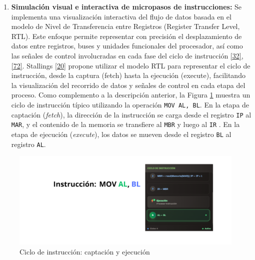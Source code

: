 \documentclass[12pt,oneside]{templates/unerthesis}
\providecommand{\tightlist}{%
  \setlength{\itemsep}{0pt}\setlength{\parskip}{0pt}}
\begin{document}
\begin{enumerate}
\def\labelenumi{\arabic{enumi}.}
\setcounter{enumi}{3}
\tightlist
\item
  \textbf{Simulación visual e interactiva de micropasos de instrucciones:}
  Se implementa una visualización interactiva del flujo de datos basada en el modelo de Nivel de Transferencia entre Registros (Register Transfer Level, RTL). Este enfoque permite representar con precisión el desplazamiento de datos entre registros, buses y unidades funcionales del procesador, así como las señales de control involucradas en cada fase del ciclo de instrucción \protect\hyperlink{ref-harris2015digital}{{[}32{]}}, \protect\hyperlink{ref-ASMVisualizer2025}{{[}72{]}}. Stallings \protect\hyperlink{ref-stallings_computer_2021}{{[}20{]}} propone utilizar el modelo RTL para representar el ciclo de instrucción, desde la captura (fetch) hasta la ejecución (execute), facilitando la visualización del recorrido de datos y señales de control en cada etapa del proceso.
  Como complemento a la descripción anterior, la Figura \ref{fig:cicloinstruccion} muestra un ciclo de instrucción típico utilizando la operación \texttt{MOV\ AL,\ BL}. En la etapa de captación (\emph{fetch}), la dirección de la instrucción se carga desde el registro \texttt{IP} al \texttt{MAR}, y el contenido de la memoria se transfiere al \texttt{MBR} y luego al \texttt{IR} . En la etapa de ejecución (\emph{execute}), los datos se mueven desde el registro \texttt{BL} al registro \texttt{AL}.
\end{enumerate}

\begin{figure}

{\centering \includegraphics[width=0.85\linewidth]{images/cicloinstruccion} 

}

\caption{Ciclo de instrucción: captación y ejecución}\label{fig:cicloinstruccion}
\end{figure}
\end{document}
